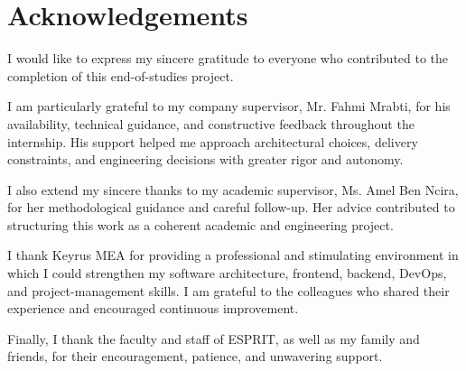 \chapter*{Acknowledgements}

I would like to express my sincere gratitude to everyone who contributed to the completion of this end-of-studies project.

I am particularly grateful to my company supervisor, Mr. Fahmi Mrabti, for his availability, technical guidance, and constructive feedback throughout the internship. His support helped me approach architectural choices, delivery constraints, and engineering decisions with greater rigor and autonomy.

I also extend my sincere thanks to my academic supervisor, Ms. Amel Ben Ncira, for her methodological guidance and careful follow-up. Her advice contributed to structuring this work as a coherent academic and engineering project.

I thank Keyrus MEA for providing a professional and stimulating environment in which I could strengthen my software architecture, frontend, backend, DevOps, and project-management skills. I am grateful to the colleagues who shared their experience and encouraged continuous improvement.

Finally, I thank the faculty and staff of ESPRIT, as well as my family and friends, for their encouragement, patience, and unwavering support.

